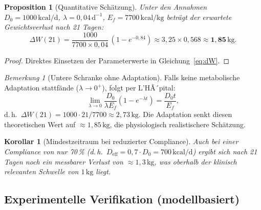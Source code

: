 ﻿\documentclass[12pt,a4paper]{article}
\theoremstyle{plain}
\newtheorem{proposition}[theorem]{Proposition}
\newtheorem{corollary}[theorem]{Korollar}
\theoremstyle{definition}
\theoremstyle{remark}
\newtheorem{remark}[theorem]{Bemerkung}
\begin{document}
\begin{proposition}[Quantitative Schätzung]
\label{prop:quant}
Unter den Annahmen $D_0 = 1000\,\text{kcal/d}$,
$\lambda = 0{,}04\,\text{d}^{-1}$, $E_f = 7700\,\text{kcal/kg}$
beträgt der erwartete Gewichtsverlust nach 21 Tagen:
\begin{equation}
  \Delta W(21) = \frac{1000}{7700 \times 0{,}04}\,(1-e^{-0{,}84})
  \approx 3{,}25 \times 0{,}568 \approx \mathbf{1{,}85}\,\text{kg}.
\end{equation}
\end{proposition}

\begin{proof}
Direktes Einsetzen der Parameterwerte in Gleichung~\eqref{eq:dW}.
\end{proof}

\begin{remark}[Untere Schranke ohne Adaptation]
Falls keine metabolische Adaptation stattfände ($\lambda \to 0^+$), folgt
per L'HÃ´pital:
\begin{equation}
  \lim_{\lambda \to 0} \frac{D_0}{\lambda E_f}(1-e^{-\lambda t}) = \frac{D_0 t}{E_f},
\end{equation}
d.\,h.\ $\Delta W(21) = 1000 \cdot 21 / 7700 \approx 2{,}73\,\text{kg}$.
Die Adaptation senkt diesen theoretischen Wert auf $\approx 1{,}85\,\text{kg}$,
die physiologisch realistischere Schätzung.
\end{remark}

\begin{corollary}[Mindestzeitraum bei reduzierter Compliance]
Auch bei einer Compliance von nur 70\,\% (d.\,h.\
$D_\text{eff} = 0{,}7 \cdot D_0 = 700\,\text{kcal/d}$) ergibt sich nach 21 Tagen
noch ein messbarer Verlust von $\approx 1{,}3\,\text{kg}$, was oberhalb der
klinisch relevanten Schwelle von $1\,\text{kg}$ liegt.
\end{corollary}

\subsection{Experimentelle Verifikation (modellbasiert)}
\label{ssec:diet_exp}
\end{document}
